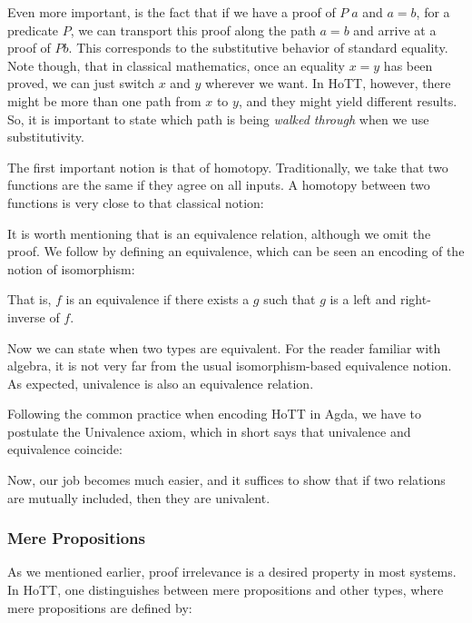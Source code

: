   Even more important, is the fact that if we have a proof of $P\; a$ and $a = b$, for a predicate $P$, we can
  transport this proof along the path $a = b$ and arrive at a proof of $P b$. This corresponds to
  the substitutive behavior of standard equality. Note though, that in classical mathematics,
  once an equality $x = y$ has been proved, we can just switch $x$ and $y$ wherever we want. 
  In HoTT, however, there might be more than one path from $x$ to $y$, and they might yield different
  results. So, it is important to state which path is being \emph{walked through} when we use substitutivity.
  
  The first important notion is that of homotopy. Traditionally, we take that two functions are
  the same if they agree on all inputs. A homotopy between two functions is very close to that
  classical notion:
  
  
  It is worth mentioning that \F{\_\~{}\_} is an equivalence relation, although we omit the proof.
  We follow by defining an equivalence, which can be seen an encoding of the notion of isomorphism:
  
  
  That is, $f$ is an equivalence if there exists a $g$ such that $g$ is a left and right-inverse
  of $f$.
  
  Now we can state when two types are equivalent. For the reader familiar with algebra, it is
  not very far from the usual isomorphism-based equivalence notion. As expected, univalence is
  also an equivalence relation.
  
  
  Following the common practice when encoding HoTT in Agda, we have to postulate the Univalence
  axiom, which in short says that univalence and equivalence coincide:
  
  
  Now, our job becomes much easier, and it suffices to show that if two relations are
  mutually included, then they are univalent.
  
  \subsubsection{Mere Propositions}
  
  As we mentioned earlier, proof irrelevance is a desired property in most systems. In HoTT,
  one distinguishes between mere propositions and other types, where mere propositions
  are defined by:
  
